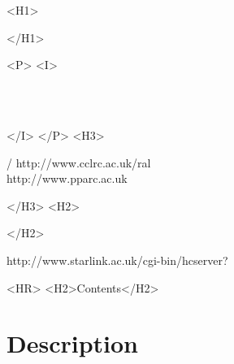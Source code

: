 \begin{htmlonly}
   \xlabel{}
   \begin{rawhtml} <H1> \end{rawhtml}
      \stardoctitle
   \begin{rawhtml} </H1> \end{rawhtml}


   \begin{rawhtml} <P> <I> \end{rawhtml}
   \stardoccategory\ \stardocnumber \\
   \stardocauthors \\
   \stardocdate
   \begin{rawhtml} </I> </P> <H3> \end{rawhtml}
       /
                        {http://www.cclrc.ac.uk/ral} \\
                        {http://www.pparc.ac.uk} \\
   \begin{rawhtml} </H3> <H2> \end{rawhtml}
   \begin{rawhtml} </H2> \end{rawhtml}
      {http://www.starlink.ac.uk/cgi-bin/hcserver?\stardocsource}\\

  \label{stardoccontents}
  \begin{rawhtml}
    <HR>
    <H2>Contents</H2>
  \end{rawhtml}

  \section{Description}

\end{htmlonly}

